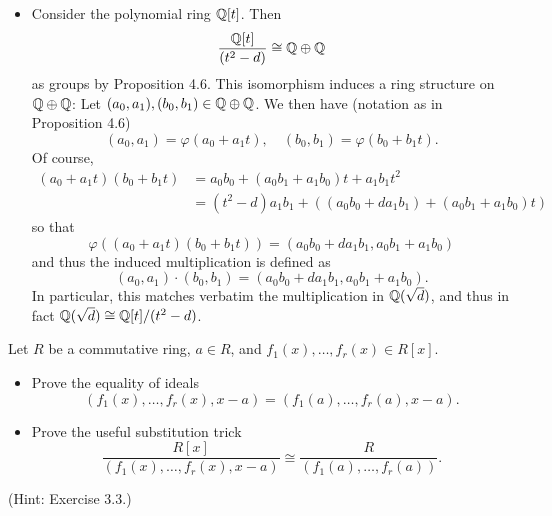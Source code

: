 \begin{solution}
\begin{itemize}
		\item Consider the polynomial ring $\mathbb{Q}[t]$. Then
		\[
			\frac{\mathbb{Q}[t]}{(t^2 - d)} \cong \mathbb{Q} \oplus \mathbb{Q}
		\]
		as groups by Proposition 4.6. This isomorphism induces a ring structure on $\mathbb{Q} \oplus \mathbb{Q}$: Let $(a_0, a_1), (b_0, b_1) \in \mathbb{Q} \oplus \mathbb{Q}$. We then have (notation as in Proposition 4.6)
		\[
			(a_0, a_1) = \varphi(a_0 + a_1 t), \quad (b_0, b_1) = \varphi(b_0 + b_1 t) \text{.}
		\]
		Of course,
		\begin{align*}
			(a_0 + a_1 t)(b_0 + b_1 t) &= a_0 b_0 + (a_0 b_1 + a_1 b_0) t + a_1 b_1 t^2 \\
			&= (t^2 - d) a_1 b_1 + ((a_0 b_0 + d a_1 b_1) + (a_0 b_1 + a_1 b_0) t)
		\end{align*}
		so that
		\[
			\varphi((a_0 + a_1 t)(b_0 + b_1 t)) = (a_0 b_0 + d a_1 b_1, a_0 b_1 + a_1 b_0)
		\]
		and thus the induced multiplication is defined as
		\[
			(a_0, a_1) \cdot (b_0, b_1) = (a_0 b_0 + d a_1 b_1, a_0 b_1 + a_1 b_0) \text{.}
		\]
		In particular, this matches verbatim the multiplication in $\mathbb{Q}(\sqrt{d})$, and thus in fact $\mathbb{Q}(\sqrt{d}) \cong \mathbb{Q}[t]/(t^2 - d)$. \qedhere
	\end{itemize}
\end{solution}

\begin{problem}
	Let $R$ be a commutative ring, $a \in R$, and $f_1(x), \dots, f_r(x) \in R[x]$.
	\begin{itemize}
		\item Prove the equality of ideals
		\[
			(f_1(x), \dots, f_r(x), x-a) = (f_1(a), \dots, f_r(a), x-a) \text{.}
		\]
		\item Prove the useful substitution trick
		\[
			\frac{R[x]}{(f_1(x), \dots, f_r(x), x-a)} \cong \frac{R}{(f_1(a), \dots, f_r(a))} \text{.}
		\]
	\end{itemize}
	(Hint: Exercise 3.3.)
\end{problem}

